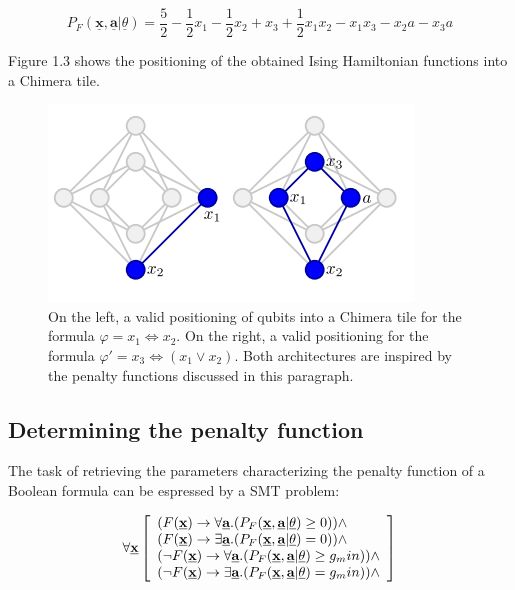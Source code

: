 \begin{equation}
    P_F(\underline{\textbf{x}},\underline{\textbf{a}} | \underline{\theta}) = \frac{5}{2} - \frac{1}{2} x_1 - \frac{1}{2} x_2 + x_3 + \frac{1}{2} x_1x_2 - x_1x_3 - x_2a -x_3a
\end{equation}

Figure 1.3 shows the positioning of the obtained Ising Hamiltonian functions into a Chimera tile.
\begin{figure}[t]
	\begin{center}
	\includegraphics[width=.7\textwidth]{images/Ising1+2.png}
	\caption{On the left, a valid positioning of qubits into a Chimera tile for the formula $\varphi = x_1 \iff x_2$. On the right, a valid positioning for the formula $\varphi ' = x_3 \iff (x_1 \vee x_2)$. Both architectures are inspired by the penalty functions discussed in this paragraph.}
	\end{center}
\end{figure}

\subsection{Determining the penalty function}

The task of retrieving the parameters characterizing the penalty function of a Boolean formula can be espressed by a SMT problem:

\begin{equation}
    \forall \textbf{\underline{x}} \left[
        \begin{array}{lr}
            ( F(\underline{\textbf{x}}) \rightarrow \forall \underline{\textbf{a}}.(P_F(\underline{\textbf{x}},\underline{\textbf{a}} | \underline{\theta}) \geq 0 )) \land \\
            ( F(\underline{\textbf{x}}) \rightarrow \exists \underline{\textbf{a}}.(P_F(\underline{\textbf{x}},\underline{\textbf{a}} | \underline{\theta}) = 0 )) \land \\
            ( \neg F(\underline{\textbf{x}}) \rightarrow \forall \underline{\textbf{a}}.(P_F(\underline{\textbf{x}},\underline{\textbf{a}} | \underline{\theta}) \geq g_min )) \land \\
            ( \neg F(\underline{\textbf{x}}) \rightarrow \exists \underline{\textbf{a}}.(P_F(\underline{\textbf{x}},\underline{\textbf{a}} | \underline{\theta}) = g_min )) \land \\
        \end{array}
    \right]
\end{equation}

